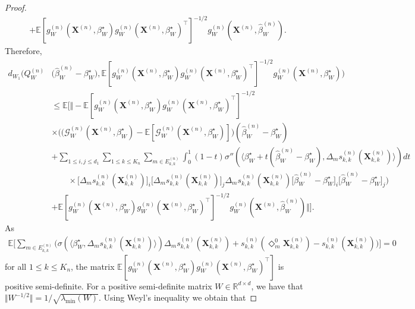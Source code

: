 \documentclass{article}
\begin{document}
\begin{proof}
\begin{align*}
    & +\mathbb{E}[g_W^{(n)}(\mathbf{X}^{(n)},\beta_W^{\star})g_W^{(n)}(\mathbf{X}^{(n)},\beta_W^{\star})^{\top}]^{-1/2} g_W^{(n)}(\mathbf{X}^{(n)},\hat{\beta}_W^{(n)}).
\end{align*}
Therefore,
\begin{align*}
    d_{W_1}\Big(Q_W^{(n)} &\big( \hat{\beta}_W^{(n)}-\beta_W^{\star}\big) , \mathbb{E}[g_W^{(n)}(\mathbf{X}^{(n)},\beta_W^{\star})g_W^{(n)}(\mathbf{X}^{(n)},\beta_W^{\star})^{\top}]^{-1/2} g_W^{(n)}(\mathbf{X}^{(n)},\beta_W^{\star}) \Big) \\
    & \leq \mathbb{E} \bigg[ \bigg\Vert -\mathbb{E}[g_W^{(n)}(\mathbf{X}^{(n)},\beta_W^{\star})g_W^{(n)}(\mathbf{X}^{(n)},\beta_W^{\star})^{\top}]^{-1/2} \\
    & \times \bigg(  \big(\mathcal{G}_W^{(n)}(\mathbf{X}^{(n)},\beta_W^{\star}) - \mathbb{E}[\mathcal{G}_W^{(n)}(\mathbf{X}^{(n)},\beta_W^{\star})]  \big)(\hat{\beta}_W^{(n)} - \beta_W^{\star}) \\
    & +\sum_{1 \leq i,j \leq d_1} \sum_{1\leq k \leq K_n} \sum_{m \in E_{k,k}^{(n)}} \int_0^1 (1-t) \sigma'' ( \langle \beta_W^{\star} + t(\hat{\beta}_W^{(n)} - \beta_W^{\star}) , \Delta_m s_{k,k}^{(n)}(\mathbf{X}_{k,k}^{(n)}) \rangle )dt  \\
    & \qquad \times \big[\Delta_m s_{k,k}^{(n)}(\mathbf{X}_{k,k}^{(n)}) \big]_i \big[\Delta_m s_{k,k}^{(n)}(\mathbf{X}_{k,k}^{(n)}) \big]_j \Delta_m s_{k,k}^{(n)}(\mathbf{X}_{k,k}^{(n)})  \big[ \hat{\beta}_W^{(n)}-\beta_W^{\star}\big]_i \big[ \hat{\beta}_W^{(n)}-\beta_W^{\star}\big]_j \bigg) \\
    & +\mathbb{E}[g_W^{(n)}(\mathbf{X}^{(n)},\beta_W^{\star})g_W^{(n)}(\mathbf{X}^{(n)},\beta_W^{\star})^{\top}]^{-1/2} g_W^{(n)}(\mathbf{X}^{(n)},\hat{\beta}_W^{(n)}) \bigg\Vert \bigg].
\end{align*}
As \begin{align*}
    \mathbb{E} \bigg[ 
    \sum_{m \in E_{k,k}^{(n)}} \big( \sigma ( \langle \beta_W^{\star} , \Delta_m s_{k,k}^{(n)}(\mathbf{X}_{k,k}^{(n)}) \rangle )  \Delta_m s_{k,k}^{(n)}(\mathbf{X}_{k,k}^{(n)}) +  s_{k,k}^{(n)}(\Diamond_{m}^{0} \mathbf{X}_{k,k}^{(n)}) - s_{k,k}^{(n)}(\mathbf{X}_{k,k}^{(n)}) \big) \bigg] 
    = 0
\end{align*}
for all $1\leq k \leq K_n$, the matrix $\mathbb{E}[g_W^{(n)}(\mathbf{X}^{(n)},\beta_W^{\star})g_W^{(n)}(\mathbf{X}^{(n)},\beta_W^{\star})^{\top}]$ is positive semi-definite. For a positive semi-definite matrix $W \in \mathbb{R}^{d \times d}$, we have that $\Vert W^{-1/2} \Vert = 1/\sqrt{\lambda_\mathrm{min}(W)}$. Using Weyl's inequality we obtain that 

\end{proof}
\end{document}
